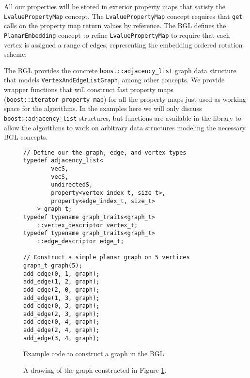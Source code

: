 \documentclass[letterpaper, 12pt]{article}
\theoremstyle{definition}
\theoremstyle{definition}
\theoremstyle{thm}
\theoremstyle{definition}
\begin{document}
All our properties will be stored in exterior property maps that satisfy the
\texttt{Lvalue{\allowbreak}Property{\allowbreak}Map} concept. The \texttt{Lvalue{\allowbreak}Property{\allowbreak}Map} concept requires
that \texttt{get} calls on the property map return values by reference.
The BGL defines the \texttt{PlanarEmbedding} concept to refine
\texttt{Lvalue{\allowbreak}Property{\allowbreak}Map} to require that each vertex is assigned a range of
edges, representing the embedding ordered rotation scheme.

The BGL provides the concrete \texttt{boost::adjacency\_list} graph data structure that
models \texttt{VertexAndEdgeListGraph}, among other concepts. We provide wrapper
functions that will construct fast property maps (\texttt{boost::iterator\_property\_map})
for all the property maps just used as working space for the algorithms.
In the examples here we will only discuss \texttt{boost::adjacency\_list} structures,
but functions are available in the library to allow the algorithms to work on
arbitrary data structures modeling the necessary BGL concepts.

\begin{figure}
\begin{lstlisting}[frame=single]
// Define our the graph, edge, and vertex types
typedef adjacency_list<
        vecS,
        vecS,
        undirectedS,
        property<vertex_index_t, size_t>,
        property<edge_index_t, size_t>
    > graph_t;
typedef typename graph_traits<graph_t>
    ::vertex_descriptor vertex_t;
typedef typename graph_traits<graph_t>
    ::edge_descriptor edge_t;

// Construct a simple planar graph on 5 vertices
graph_t graph(5);
add_edge(0, 1, graph);
add_edge(1, 2, graph);
add_edge(2, 0, graph);
add_edge(1, 3, graph);
add_edge(0, 3, graph);
add_edge(2, 3, graph);
add_edge(0, 4, graph);
add_edge(2, 4, graph);
add_edge(3, 4, graph);
\end{lstlisting}
\caption{Example code to construct a graph in the BGL.}
\label{example_make_graph}
\end{figure}

\begin{figure}
\begin{center}
\end{center}
\caption{A drawing of the graph constructed in Figure \ref{example_make_graph}.}
\end{figure}
\end{document}
